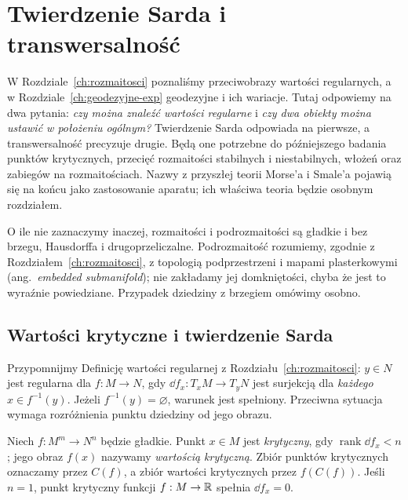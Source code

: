 \chapter{Twierdzenie Sarda i transwersalność}
\label{ch:sard-transwersalnosc}

W Rozdziale~\ref{ch:rozmaitosci} poznaliśmy przeciwobrazy
wartości regularnych, a w Rozdziale~\ref{ch:geodezyjne-exp}
geodezyjne i ich wariacje. Tutaj odpowiemy na dwa pytania:
\emph{czy można znaleźć wartości regularne} i
\emph{czy dwa obiekty można ustawić w położeniu ogólnym?}
Twierdzenie Sarda odpowiada na pierwsze, a transwersalność
precyzuje drugie. Będą one potrzebne do późniejszego
badania punktów krytycznych, przecięć rozmaitości
stabilnych i niestabilnych, włożeń oraz zabiegów na
rozmaitościach. Nazwy z przyszłej teorii Morse'a i
Smale'a pojawią się na końcu jako zastosowanie aparatu;
ich właściwa teoria będzie osobnym rozdziałem.

O ile nie zaznaczymy inaczej, rozmaitości i podrozmaitości
są gładkie i bez brzegu, Hausdorffa i drugoprzeliczalne.
Podrozmaitość rozumiemy, zgodnie z Rozdziałem~\ref{ch:rozmaitosci},
z topologią podprzestrzeni i mapami plasterkowymi
(ang.\ \emph{embedded submanifold}); nie zakładamy jej
domkniętości, chyba że jest to wyraźnie powiedziane.
Przypadek dziedziny z brzegiem omówimy osobno.

\section{Wartości krytyczne i twierdzenie Sarda}
\label{sec:sard}

Przypomnijmy Definicję wartości regularnej z
Rozdziału~\ref{ch:rozmaitosci}: $y\in N$ jest regularna
dla $f:M\to N$, gdy $\dd f_x:T_xM\to T_yN$ jest
surjekcją dla \emph{każdego} $x\in f^{-1}(y)$.
Jeżeli $f^{-1}(y)=\varnothing$, warunek jest spełniony.
Przeciwna sytuacja wymaga rozróżnienia punktu dziedziny
od jego obrazu.

\begin{definicja}
\label{def:sard-krytyczne}
Niech $f:M^m\to N^n$ będzie gładkie.
Punkt $x\in M$ jest \emph{krytyczny}, gdy
$\operatorname{rank}\dd f_x<n$; jego obraz $f(x)$
nazywamy \emph{wartością krytyczną}. Zbiór punktów
krytycznych oznaczamy przez $C(f)$, a zbiór wartości
krytycznych przez $f(C(f))$. Jeśli $n=1$, punkt
krytyczny funkcji $f:M\to\mathbb{R}$ spełnia $\dd f_x=0$.
\end{definicja}

